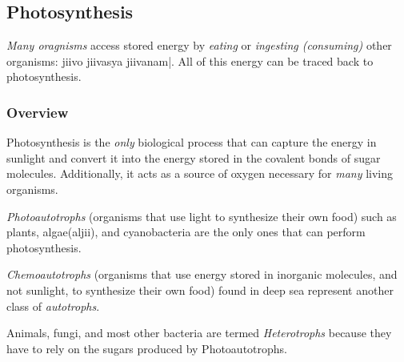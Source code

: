 \documentclass[12pt]{article}
\begin{document}
\subsection{Photosynthesis}
\emph{Many oragnisms} access stored energy by \emph{eating} or \emph{ingesting (consuming)} other organisms: \textmarathi{jiivo jiivasya jiivanam|}. All of this energy can be traced back to photosynthesis.
\subsubsection{Overview}
Photosynthesis is the \emph{only} biological process that can capture the energy in sunlight and convert it into the energy stored in the covalent bonds of sugar molecules. Additionally, it acts as a source of oxygen necessary for \emph{many} living organisms.

\emph{Photoautotrophs} (organisms that use light to synthesize their own food) such as plants, algae(\textmarathi{\dev aljii}), and cyanobacteria are the only ones that can perform photosynthesis.

\emph{Chemoautotrophs} (organisms that use energy stored in inorganic molecules, and not sunlight, to synthesize their own food) found in deep sea represent another class of \emph{autotrophs}.

Animals, fungi, and most other bacteria are termed \emph{Heterotrophs} because they have to rely on the sugars produced by Photoautotrophs.
\end{document}
